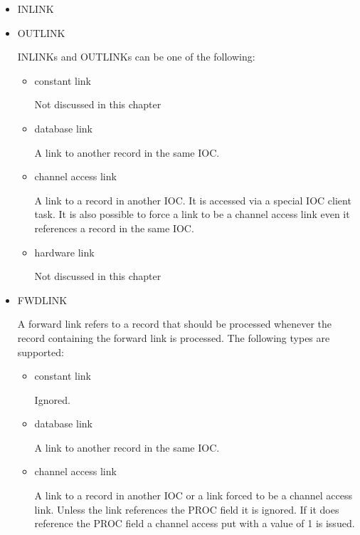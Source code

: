 \begin{itemize}
\item {}INLINK
\item {}OUTLINK

INLINKs and OUTLINKs can be one of the following:

\begin{itemize}
\item {} constant link

Not discussed in this chapter

\item {}database link

A link to another record in the same IOC.

\item {}channel access link

A link to a record in another IOC. It is accessed via a special IOC client task. It is also possible to force a 
link to be a channel access link even it references a record in the same IOC.

\item hardware link

Not discussed in this chapter

\end{itemize}

\item {}FWDLINK

A forward link refers to a record that should be processed whenever the record containing the forward link is 
processed. The following types are supported:

\begin{itemize}

\item constant link

Ignored.

\item database link

A link to another record in the same IOC.

\item channel access link

A link to a record in another IOC or a link forced to be a channel access link. Unless the link references the 
PROC field it is ignored. If it does reference the PROC field a channel access put with a value of 1 is issued.

\end{itemize}
\end{itemize}

